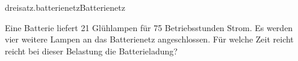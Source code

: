 \begin{exercise}{dreisatz.batterienetz}{Batterienetz}
  \ifproblem\problem\par
    Eine Batterie liefert 21 Glühlampen für 75 Betriebsstunden Strom. Es werden
    vier weitere Lampen an das Batterienetz angeschlossen. Für welche Zeit reicht
    reicht bei dieser Belastung die Batterieladung?
  \fi
\end{exercise}
